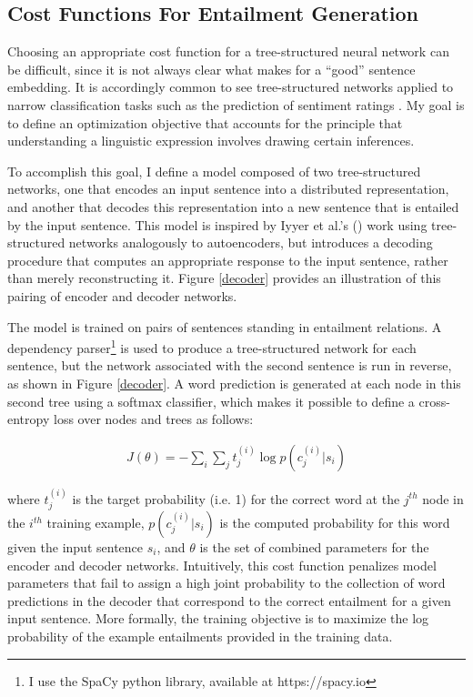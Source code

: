 \subsection{Cost Functions For Entailment Generation}

Choosing an appropriate cost function for a tree-structured neural network can be difficult, since it is not always clear what makes for a ``good'' sentence embedding. It is accordingly common to see tree-structured networks applied to narrow classification tasks such as the prediction of sentiment ratings \citep[e.g.][]{Socher:2012}. My goal is to define an optimization objective that accounts for the principle that understanding a linguistic expression involves drawing certain inferences.

To accomplish this goal, I define a model composed of two tree-structured networks, one that encodes an input sentence into a distributed representation, and another that decodes this representation into a new sentence that is entailed by the input sentence. This model is inspired by Iyyer et al.'s (\citeyear{Iyyer:2014}) work using tree-structured networks analogously to autoencoders, but introduces a decoding procedure that computes an appropriate response to the input sentence, rather than merely reconstructing it. Figure \ref{decoder} provides an illustration of this pairing of encoder and decoder networks.

The model is trained on pairs of sentences standing in entailment relations. A dependency parser\footnote{I use the SpaCy python library, available at https://spacy.io} is used to produce a tree-structured network for each sentence, but the network associated with the second sentence is run in reverse, as shown in Figure \ref{decoder}. A word prediction is generated at each node in this second tree using a softmax classifier, which makes it possible to define a cross-entropy loss over nodes and trees as follows: 

\begin{align}
J(\theta) = - \sum_{i} \sum_{j} t^{(i)}_j \log{ p(c^{(i)}_j | s_i)}
\end{align}

\noindent
where $t^{(i)}_j$ is the target probability (i.e. 1) for the correct word at the $j^{th}$ node in the $i^{th}$ training example, $p(c^{(i)}_j | s_i)$ is the computed probability for this word given the input sentence $s_i$, and $\theta$ is the set of combined parameters for the encoder and decoder networks. Intuitively, this cost function penalizes model parameters that fail to assign a high joint probability to the collection of word predictions in the decoder that correspond to the correct entailment for a given input sentence. More formally, the training objective is to maximize the log probability of the example entailments provided in the training data. 

